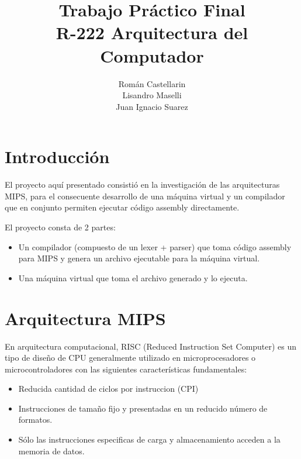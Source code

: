 \documentclass[12pt]{article}
\begin{document}
\title{
Trabajo Práctico Final \\
\large R-222 Arquitectura del Computador}
\author{ Román Castellarin\\
Lisandro Maselli\\
Juan Ignacio Suarez}
\maketitle
\section{Introducción}
El proyecto aquí presentado consistió en la investigación de las arquitecturas MIPS, para el consecuente desarrollo de una máquina virtual y un compilador que en conjunto permiten ejecutar código assembly directamente.

El proyecto consta de 2 partes:
\begin{itemize}
\item Un compilador (compuesto de un lexer + parser) que toma código assembly para MIPS y genera un archivo ejecutable para la máquina virtual.
\item Una máquina virtual que toma el archivo generado y lo ejecuta.
\end{itemize}    

\section{Arquitectura MIPS}
En arquitectura computacional, RISC (Reduced Instruction Set Computer) es un tipo de diseño de CPU generalmente utilizado en microprocesadores
o microcontroladores con las siguientes características fundamentales:
\begin{itemize}
\item Reducida cantidad de ciclos por instruccion (CPI)
\item Instrucciones de tamaño fijo y presentadas en un reducido número de formatos.
\item Sólo las instrucciones especificas de carga y almacenamiento acceden a la memoria de datos.
\end{itemize}
\end{document}
